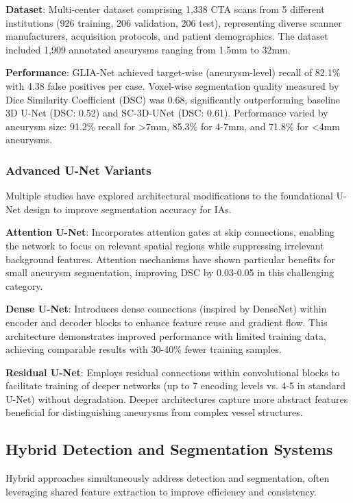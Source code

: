 \documentclass[conference]{IEEEtran}
\begin{document}
\textbf{Dataset}: Multi-center dataset comprising 1,338 CTA scans from 5 different institutions (926 training, 206 validation, 206 test), representing diverse scanner manufacturers, acquisition protocols, and patient demographics. The dataset included 1,909 annotated aneurysms ranging from 1.5mm to 32mm.

\textbf{Performance}: GLIA-Net achieved target-wise (aneurysm-level) recall of 82.1\% with 4.38 false positives per case. Voxel-wise segmentation quality measured by Dice Similarity Coefficient (DSC) was 0.68, significantly outperforming baseline 3D U-Net (DSC: 0.52) and SC-3D-UNet (DSC: 0.61). Performance varied by aneurysm size: 91.2\% recall for >7mm, 85.3\% for 4-7mm, and 71.8\% for <4mm aneurysms.

\subsubsection{Advanced U-Net Variants}
Multiple studies have explored architectural modifications to the foundational U-Net design to improve segmentation accuracy for IAs.

\textbf{Attention U-Net}: Incorporates attention gates at skip connections, enabling the network to focus on relevant spatial regions while suppressing irrelevant background features. Attention mechanisms have shown particular benefits for small aneurysm segmentation, improving DSC by 0.03-0.05 in this challenging category.

\textbf{Dense U-Net}: Introduces dense connections (inspired by DenseNet) within encoder and decoder blocks to enhance feature reuse and gradient flow. This architecture demonstrates improved performance with limited training data, achieving comparable results with 30-40\% fewer training samples.

\textbf{Residual U-Net}: Employs residual connections within convolutional blocks to facilitate training of deeper networks (up to 7 encoding levels vs. 4-5 in standard U-Net) without degradation. Deeper architectures capture more abstract features beneficial for distinguishing aneurysms from complex vessel structures.

\subsection{Hybrid Detection and Segmentation Systems}

Hybrid approaches simultaneously address detection and segmentation, often leveraging shared feature extraction to improve efficiency and consistency.
\end{document}
